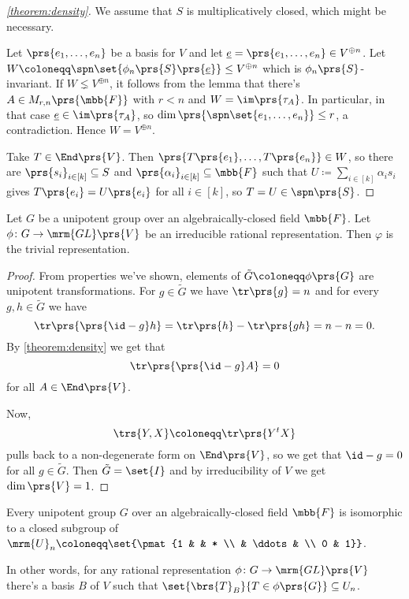 \documentclass[10pt,a4paper,twoside,openany,hidelinks]{book}
\begin{document}

\begin{proof}[\ref{theorem:density}]
We assume that $S$ is multiplicatively closed, which might be necessary.

Let $\prs{e_1, \ldots, e_n}$ be a basis for $V$ and let $\underline{e} = \prs{e_1, \ldots, e_n} \in V^{\oplus n}$.
Let $W \coloneqq \spn\set{\phi_n\prs{S}\prs{\underline{e}}} \leq V^{\oplus n}$ which is $\phi_n\prs{S}$-invariant.
If $W \lneq V^{\oplus n}$, it follows from the lemma that there's $A \in M_{r,n}\prs{\mbb{F}}$ with $r < n$ and $W = \im \prs{\tau_A}$. In particular, in that case $\underline{e} \in \im\prs{\tau_A}$, so $\dim\prs{\spn\set{e_1, \ldots, e_n}} \leq r$,
a contradiction.
Hence $W = V^{\oplus n}$.

Take $T \in \End\prs{V}$. Then $\prs{T\prs{e_1}, \ldots, T\prs{e_n}} \in W$, so there are $\prs{s_i}_{i \in [k]} \subseteq S$ and $\prs{\alpha_i}_{i \in [k]} \subseteq \mbb{F}$ such that $U \coloneqq \sum_{i \in [k]} \alpha_i s_i$ gives $T\prs{e_i} = U\prs{e_i}$ for all $i \in [k]$, so $T = U \in \spn\prs{S}$.
\end{proof}

\begin{theorem}
Let $G$ be a unipotent group over an algebraically-closed field $\mbb{F}$. Let $\phi \colon G \to \mrm{GL}\prs{V}$ be an irreducible rational representation. Then $\varphi$ is the trivial representation.
\end{theorem}

\begin{proof}
From properties we've shown, elements of $\tilde{G} \coloneqq \phi\prs{G}$ are unipotent transformations.
For $g \in \tilde{G}$ we have
$\tr\prs{g} = n$ and for every $g,h \in \tilde{G}$ we have
\[\tr\prs{\prs{\id-g}h} = \tr\prs{h} - \tr\prs{gh} = n-n = 0\text{.}\]
By \ref{theorem:density} we get that
\[\tr\prs{\prs{\id-g}A} = 0\]
for all $A \in \End\prs{V}$.

Now,
\[\trs{Y,X} \coloneqq \tr\prs{Y^t X}\]
pulls back to a non-degenerate form on $\End\prs{V}$, %
so we get that $\id - g = 0$ for all $g \in \tilde{G}$. Then $\tilde{G} = \set{I}$ and by irreducibility of $V$ we get $\dim\prs{V} = 1$.
\end{proof}


\begin{corollary}
Every unipotent group $G$ over an algebraically-closed field $\mbb{F}$ is isomorphic to a closed subgroup of $\mrm{U}_n \coloneqq \set{\pmat{1 & & * \\ & \ddots & \\ 0 & 1}}$.

In other words, for any rational representation $\phi \colon G \to \mrm{GL}\prs{V}$ there's a basis $B$ of $V$ such that $\set{\brs{T}_B}{T \in \phi\prs{G}} \subseteq U_n$.
\end{corollary}
\end{document}
